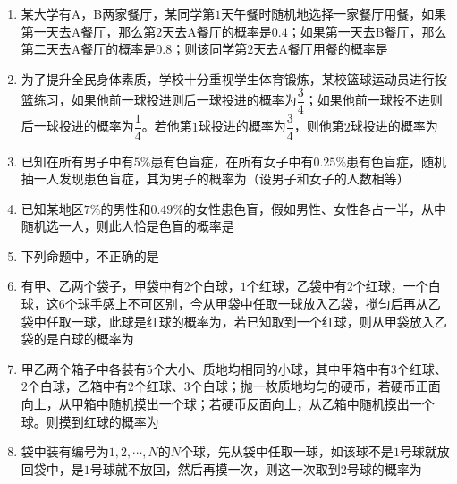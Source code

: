\begin{enumerate}

\item 某大学有A，B两家餐厅，某同学第$1$天午餐时随机地选择一家餐厅用餐，如果第一天去A餐厅，那么第$2$天去A餐厅的概率是$0.4$；如果第一天去B餐厅，那么第二天去A餐厅的概率是$0.8$；则该同学第$2$天去A餐厅用餐的概率是

\item 为了提升全民身体素质，学校十分重视学生体育锻炼，某校篮球运动员进行投篮练习，如果他前一球投进则后一球投进的概率为$\dfrac{3}{4}$；如果他前一球投不进则后一球投进的概率为$\dfrac{1}{4}$。若他第$1$球投进的概率为$\dfrac{3}{4}$，则他第$2$球投进的概率为

\item 已知在所有男子中有$5\%$患有色盲症，在所有女子中有$0.25\%$患有色盲症，随机抽一人发现患色盲症，其为男子的概率为（设男子和女子的人数相等）

\item 已知某地区$7\%$的男性和$0.49\%$的女性患色盲，假如男性、女性各占一半，从中随机选一人，则此人恰是色盲的概率是

\item 下列命题中，不正确的是

\item 有甲、乙两个袋子，甲袋中有$2$个白球，$1$个红球，乙袋中有$2$个红球，一个白球，这$6$个球手感上不可区别，今从甲袋中任取一球放入乙袋，搅匀后再从乙袋中任取一球，此球是红球的概率为，若已知取到一个红球，则从甲袋放入乙袋的是白球的概率为

\item 甲乙两个箱子中各装有$5$个大小、质地均相同的小球，其中甲箱中有$3$个红球、$2$个白球，乙箱中有$2$个红球、$3$个白球；抛一枚质地均匀的硬币，若硬币正面向上，从甲箱中随机摸出一个球；若硬币反面向上，从乙箱中随机摸出一个球。则摸到红球的概率为

\item 袋中装有编号为$1,2,\cdots,N$的$N$个球，先从袋中任取一球，如该球不是$1$号球就放回袋中，是$1$号球就不放回，然后再摸一次，则这一次取到$2$号球的概率为


\end{enumerate}
